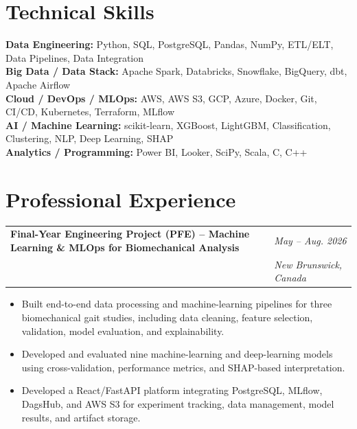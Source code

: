 \documentclass[10pt,letterpaper]{article}
\makeatletter
\newcommand{\resumeEntry}[4]{%
    \begin{tabularx}{\textwidth}
    {@{}>{\RaggedRight\arraybackslash}X
    >{\RaggedLeft\arraybackslash}p{1.65in}@{}}

        \textbf{#1}
        &
        {\small\textit{#2}}
        \\[-1pt]

        {\small\textit{\color{secondary}#3}}
        &
        {\small\textit{\color{secondary}#4}}

    \end{tabularx}
}
\newcommand{\skill}[2]{%
    \textbf{#1:} #2\\[1.5pt]
}
\makeatother
\begin{document}
\section{Technical Skills}

\skill{Data Engineering}
{Python, SQL, PostgreSQL, Pandas, NumPy, ETL/ELT, Data Pipelines, Data Integration}

\skill{Big Data / Data Stack}
{Apache Spark, Databricks, Snowflake, BigQuery, dbt, Apache Airflow}

\skill{Cloud / DevOps / MLOps}
{AWS, AWS S3, GCP, Azure, Docker, Git, CI/CD, Kubernetes, Terraform, MLflow}

\skill{AI / Machine Learning}
{scikit-learn, XGBoost, LightGBM, Classification, Clustering, NLP, Deep Learning, SHAP}

\skill{Analytics / Programming}
{Power BI, Looker, SciPy, Scala, C, C++}


\section{Professional Experience}

\resumeEntry
{Final-Year Engineering Project (PFE) -- Machine Learning \& MLOps for Biomechanical Analysis}
{May -- Aug. 2026}
{Human Performance Laboratory, University of New Brunswick}
{New Brunswick, Canada}
\vspace{-7pt}

\begin{itemize}

    \item Built end-to-end data processing and machine-learning pipelines for
    three biomechanical gait studies, including data cleaning, feature selection,
    validation, model evaluation, and explainability.

    \item Developed and evaluated nine machine-learning and deep-learning models
    using cross-validation, performance metrics, and SHAP-based interpretation.

    \item Developed a React/FastAPI platform integrating PostgreSQL, MLflow,
    DagsHub, and AWS S3 for experiment tracking, data management, model results,
    and artifact storage.

\end{itemize}
\end{document}
